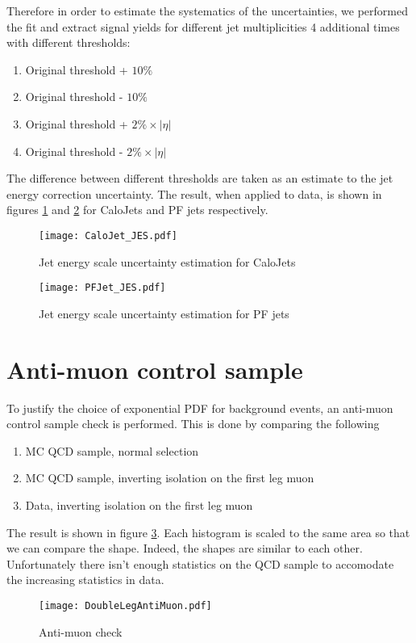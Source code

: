 \documentclass[10pt,a4paper,onecolumn]{article}
\begin{document}
Therefore in order to estimate the systematics of the uncertainties, we performed the fit and extract signal yields for different jet multiplicities 4 additional times with different thresholds:

\begin{enumerate}
\item Original threshold + $10\%$
\item Original threshold - $10\%$
\item Original threshold + $2\% \times |\eta|$
\item Original threshold - $2\% \times |\eta|$
\end{enumerate}

The difference between different thresholds are taken as an estimate to the jet energy correction uncertainty.
The result, when applied to data, is shown in figures \ref{Figure_CaloJetJES} and \ref{Figure_PFJetJES} for CaloJets and PF jets respectively.

\begin{figure}
\texttt{[image: CaloJet\_JES.pdf]}
\caption{Jet energy scale uncertainty estimation for CaloJets}
\label{Figure_CaloJetJES}
\end{figure}

\begin{figure}
\texttt{[image: PFJet\_JES.pdf]}
\caption{Jet energy scale uncertainty estimation for PF jets}
\label{Figure_PFJetJES}
\end{figure}


\section{Anti-muon control sample}

To justify the choice of exponential PDF for background events, an anti-muon control sample check is performed.
This is done by comparing the following

\begin{enumerate}
\item MC QCD sample, normal selection
\item MC QCD sample, inverting isolation on the first leg muon
\item Data, inverting isolation on the first leg muon
\end{enumerate}

The result is shown in figure \ref{Figure_AntiMuonSingleLeg}.  Each histogram is scaled to the same area so that we can compare the shape.
Indeed, the shapes are similar to each other.  Unfortunately there isn't enough statistics on the QCD sample to accomodate the increasing statistics in data.

\begin{figure}
\texttt{[image: DoubleLegAntiMuon.pdf]}
\caption{Anti-muon check}
\label{Figure_AntiMuonSingleLeg}
\end{figure}
\end{document}
